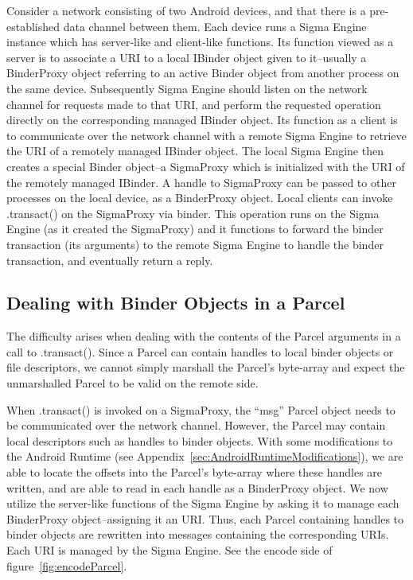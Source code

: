 \documentclass[prodmode]{acmlarge}
\begin{document}

Consider a network consisting of two Android devices, and that there is a pre-established data channel between them. Each device runs a Sigma Engine instance which has server-like and client-like functions. Its function viewed as a server is to associate a URI to a local IBinder object given to it--usually a BinderProxy object referring to an active Binder object from another process on the same device. Subsequently Sigma Engine should listen on the network channel for requests made to that URI, and perform the requested operation directly on the corresponding managed IBinder object. Its function as a client is to communicate over the network channel with a remote Sigma Engine to retrieve the URI of a remotely managed IBinder object. The local Sigma Engine then creates a special Binder object--a SigmaProxy which is initialized with the URI of the remotely managed IBinder. A handle to SigmaProxy can be passed to other processes on the local device, as a BinderProxy object. Local clients can invoke .transact() on the SigmaProxy via binder. This operation runs on the Sigma Engine (as it created the SigmaProxy) and it functions to forward the binder transaction (its arguments) to the remote Sigma Engine to handle the binder transaction, and eventually return a reply.

\subsection{Dealing with Binder Objects in a Parcel}
The difficulty arises when dealing with the contents of the Parcel arguments in a call to .transact(). Since a Parcel can contain handles to local binder objects or file descriptors, we cannot simply marshall the Parcel's byte-array and expect the unmarshalled Parcel to be valid on the remote side.

When .transact() is invoked on a SigmaProxy, the ``msg'' Parcel object needs to be communicated over the network channel. However, the Parcel may contain local descriptors such as handles to binder objects. With some modifications to the Android Runtime (see Appendix~\ref{sec:AndroidRuntimeModifications}), we are able to locate the offsets into the Parcel's byte-array where these handles are written, and are able to read in each handle as a BinderProxy object. We now utilize the server-like functions of the Sigma Engine by asking it to manage each BinderProxy object--assigning it an URI. Thus, each Parcel containing handles to binder objects are rewritten into messages containing the corresponding URIs. Each URI is managed by the Sigma Engine. See the encode side of figure~\ref{fig:encodeParcel}.
\end{document}
